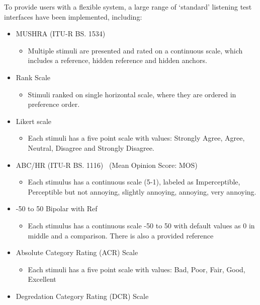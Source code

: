 \documentclass{sig-alternate}
\begin{document}
To provide users with a flexible system, a large range of `standard' listening test interfaces have been implemented, including:
	\begin{itemize}[noitemsep,nolistsep]
		\item MUSHRA (ITU-R BS. 1534)~\cite{recommendation20031534}
		\begin{itemize}
			\item Multiple stimuli are presented and rated on a continuous scale, which includes a reference, hidden reference and hidden anchors.
		\end{itemize}
		\item Rank Scale~\cite{pascoe1983evaluation}
		\begin{itemize}
			\item Stimuli ranked on single horizontal scale, where they are ordered in preference order.
		\end{itemize}
		\item Likert scale~\cite{likert1932technique}
		\begin{itemize}
			\item Each stimuli has a five point scale with values: Strongly Agree, Agree, Neutral, Disagree and Strongly Disagree.
		\end{itemize}
		\item ABC/HR (ITU-R BS. 1116)~\cite{recommendation19971116} (Mean Opinion Score: MOS)
		\begin{itemize}
			\item Each stimulus has a continuous scale (5-1), labeled as Imperceptible, Perceptible but not annoying, slightly annoying, annoying, very annoying.
		\end{itemize}
		\item -50 to 50 Bipolar with Ref
		\begin{itemize}
			\item Each stimulus has a continuous scale -50 to 50 with default values as 0 in middle and a comparison. There is also a provided reference		\end{itemize}
		\item Absolute Category Rating (ACR) Scale~\cite{rec1996p}
		\begin{itemize}
			\item Each stimuli has a five point scale with values: Bad, Poor, Fair, Good, Excellent
		\end{itemize}
		\item Degredation Category Rating (DCR) Scale~\cite{rec1996p}
		\begin{itemize}

\end{itemize}
\end{itemize}
\end{document}
